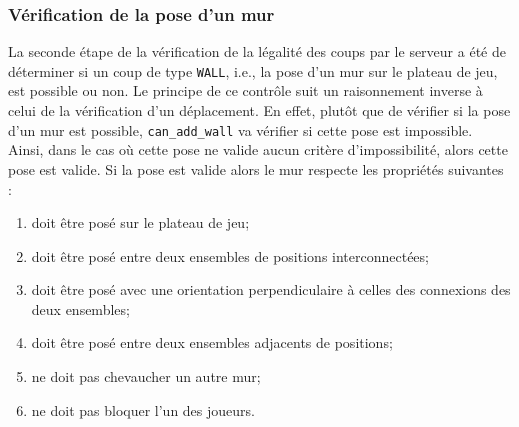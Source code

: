 \documentclass[11pt]{article}
\begin{document}
\subsubsection{Vérification de la pose d'un mur}

La seconde étape de la vérification de la légalité des coups par le serveur a été de déterminer si un coup de type \texttt{WALL}, i.e., la pose d'un mur sur le plateau de jeu, est possible ou non. Le principe de ce contrôle suit un raisonnement inverse à celui de la vérification d'un déplacement. En effet, plutôt que de vérifier si la pose d'un mur est possible, \texttt{can\_add\_wall} va vérifier si cette pose est impossible. Ainsi, dans le cas où cette pose ne valide aucun critère d'impossibilité, alors cette pose est valide. Si la pose est valide alors le mur respecte les propriétés suivantes :
\begin{enumerate}
    \item doit être posé sur le plateau de jeu;
    \item doit être posé entre deux ensembles de positions interconnectées;
    \item doit être posé avec une orientation perpendiculaire à celles des connexions des deux ensembles;
    \item doit être posé entre deux ensembles adjacents de positions;
    \item ne doit pas chevaucher un autre mur;
    \item ne doit pas bloquer l'un des joueurs.
\end{enumerate}
\end{document}

